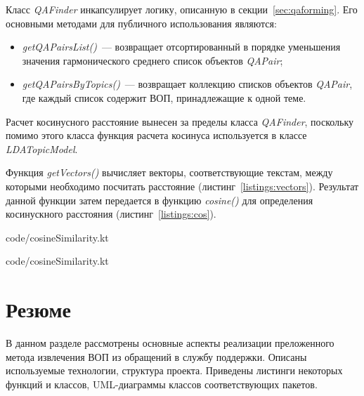 Класс \textit{QAFinder} инкапсулирует логику, описанную в секции~\ref{sec:qaforming}. Его основными методами для публичного использования являются:

\begin{itemize}
\item \textit{getQAPairsList()}~--- возвращает отсортированный в порядке уменьшения значения гармонического среднего список объектов \textit{QAPair};
\item \textit{getQAPairsByTopics()}~--- возвращает коллекцию списков объектов \textit{QAPair}, где каждый список содержит ВОП, принадлежащие к одной теме.
\end{itemize}

Расчет косинусного расстояние вынесен за пределы класса \textit{QAFinder}, поскольку помимо этого класса функция расчета косинуса используется в классе \textit{LDATopicModel}. 

Функция \textit{getVectors()} вычисляет векторы, соответствующие текстам, между которыми необходимо посчитать расстояние (листинг~\ref{listings:vectors}). Результат данной функции затем передается в функцию \textit{cosine()} для определения косинускного расстояния (листинг~\ref{listings:cos}).


{code/cosineSimilarity.kt}


{code/cosineSimilarity.kt}

\section{Резюме}

В данном разделе рассмотрены основные аспекты реализации преложенного метода извлечения ВОП из обращений в службу поддержки. Описаны используемые технологии, структура проекта. Приведены листинги некоторых функций и классов, UML-диаграммы классов соответствующих пакетов.
